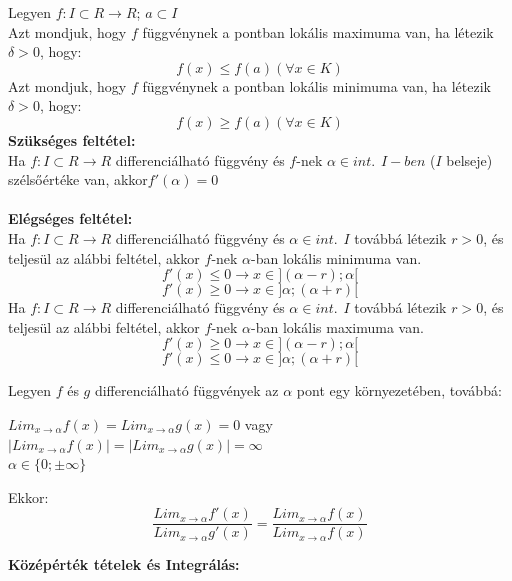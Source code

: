 \documentclass[11pt,a4paper]{article}
\begin{document}
\begin{tcolorbox}[colback=green!5!white,colframe=green!60!black,title= 6. Lokális szélsőérték definíciója és feltétele]
Legyen \(f : I \subset  R \to R\); \(a\subset  I\)\\
    Azt mondjuk, hogy \(f\) függvénynek a pontban lokális maximuma van, ha létezik \(\delta > 0\), hogy:
    $$f(x) \leq  f(a) (\forall  x \in K)$$
    Azt mondjuk, hogy \(f\) függvénynek a pontban lokális minimuma van, ha létezik \(\delta > 0\), hogy:
    $$f(x) \geq  f(a) (\forall  x \in K)$$
    \textbf{Szükséges feltétel:}\\
    Ha \(f : I \subset  R \to R\) differenciálható függvény és \(f\)-nek  \(\alpha \in int.\hspace{5pt}I-ben\) (\(I\) belseje) szélsőértéke van, akkor\(f'(\alpha)=0\)\\\\
    \textbf{Elégséges feltétel:}\\
    Ha \(f : I \subset  R \to R\) differenciálható függvény és \(\alpha \in int. \hspace{5pt}I\) továbbá létezik \(r > 0\), és teljesül az alábbi
feltétel, akkor \(f\)-nek \(\alpha\)-ban lokális minimuma van.\\
$$f'(x) \leq 0 \to x\in](\alpha -r); \alpha[$$
$$f'(x) \geq 0 \to x\in]\alpha; (\alpha + r)[$$
    Ha \(f : I \subset  R \to R\) differenciálható függvény és \(\alpha \in int. \hspace{5pt}I\) továbbá létezik \(r > 0\), és teljesül az alábbi
feltétel, akkor \(f\)-nek \(\alpha\)-ban lokális maximuma van.
$$f'(x) \geq 0 \to x\in](\alpha -r); \alpha[$$
$$f'(x) \leq 0 \to x\in]\alpha; (\alpha + r)[$$

\end{tcolorbox}

\begin{tcolorbox}[colback=green!5!white,colframe=green!60!black,title= 7. L'Hôpital szabály]
    Legyen \(f\) és \(g\) differenciálható függvények az \(\alpha\) pont egy környezetében, továbbá:
    \begin{center}
        \(Lim_{x \to \alpha} f(x)=Lim_{x \to \alpha} g(x)=0\) \hspace{10pt} vagy \hspace{10pt} \(\left\lvert Lim_{x \to \alpha} f(x) \right\rvert = \left\lvert Lim_{x \to \alpha} g(x) \right\rvert = \infty  \)\\
        \(\alpha \in \{0; \pm \infty \}\)
    \end{center}
    Ekkor: 
    $$\frac{Lim_{x \to \alpha} f'(x)}{Lim_{x \to \alpha} g'(x)} = \frac{Lim_{x \to \alpha} f(x)}{Lim_{x \to \alpha} f(x)} $$
\end{tcolorbox}
\newpage
\textbf{Középérték tételek és Integrálás:}
\end{document}
